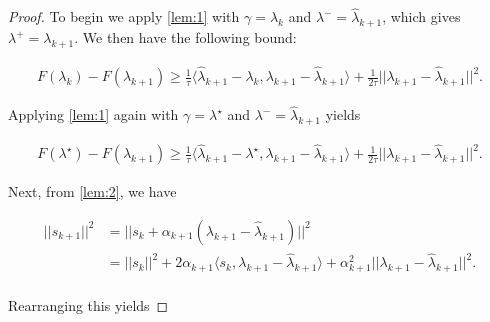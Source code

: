 \documentclass[11pt]{article}
\newcommand{\minus}{^-}
\newcommand{\inner}[2]{\langle #1, #2\rangle}
\begin{document}
\begin{proof}
To begin we apply \cref{lem:1} with $\gamma = \lambda_k$ and $\lambda\minus = \hat\lambda_{k+1}$, which gives $\lambda^+ = \lambda_{k+1}$.  We then have the following bound:

\begin{align}
\label{eq:lem:3:1}
F(\lambda_k) - F(\lambda_{k+1}) \ge \frac 1\tau\inner{\hat\lambda_{k+1} - \lambda_k}{\lambda_{k+1} - \hat\lambda_{k+1}} + \frac 1{2\tau}||\lambda_{k+1} - \hat\lambda_{k+1}||^2.
\end{align}

\noindent Applying \cref{lem:1} again with $\gamma = \lambda^\star$ and $\lambda\minus = \hat\lambda_{k+1}$ yields

\begin{align}
\label{eq:lem:3:2}
F(\lambda^\star) - F(\lambda_{k+1}) \ge \frac 1\tau\inner{\hat\lambda_{k+1} - \lambda^\star}{\lambda_{k+1} - \hat\lambda_{k+1}} + \frac 1{2\tau}||\lambda_{k+1} - \hat\lambda_{k+1}||^2.
\end{align}

\noindent Next, from \cref{lem:2}, we have

\begin{align*}
||s_{k+1}||^2 &= ||s_k + \alpha_{k+1}(\lambda_{k+1} - \hat\lambda_{k+1})||^2 \\
&= ||s_k||^2 + 2\alpha_{k+1}\inner{s_k}{\lambda_{k+1} - \hat\lambda_{k+1}} + \alpha_{k+1}^2||\lambda_{k+1} - \hat\lambda_{k+1}||^2. \\
\end{align*}

\noindent Rearranging this yields


\end{proof}
\end{document}
